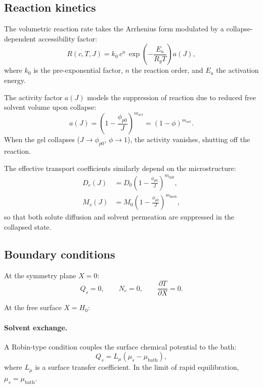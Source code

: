 \documentclass[aps,pre,reprint,superscriptaddress,longbibliography,floatfix]{revtex4-2}
\newcommand{\pp}{\phi_{p0}}
\begin{document}
\subsection{Reaction kinetics}

The volumetric reaction rate takes the Arrhenius form modulated by a collapse-dependent accessibility factor:
\begin{equation}
  R(c,T,J) = k_0\,c^n\,\exp\!\left(-\frac{E_a}{R_g T}\right) a(J),
  \label{eq:R}
\end{equation}
where $k_0$ is the pre-exponential factor, $n$ the reaction order, and $E_a$ the activation energy.

The activity factor $a(J)$ models the suppression of reaction due to reduced free solvent volume upon collapse:
\begin{equation}
  a(J) = \left(1 - \frac{\pp}{J}\right)^{m_\mathrm{act}}
  = (1-\phi)^{m_\mathrm{act}}.
  \label{eq:aJ}
\end{equation}
When the gel collapses ($J\to\pp$, $\phi\to 1$), the activity vanishes, shutting off the reaction.

The effective transport coefficients similarly depend on the microstructure:
\begin{align}
  D_c(J) &= D_0\left(1-\frac{\pp}{J}\right)^{m_\mathrm{diff}}, \label{eq:Dc} \\
  M_s(J) &= M_0\left(1-\frac{\pp}{J}\right)^{m_\mathrm{mob}}, \label{eq:Ms}
\end{align}
so that both solute diffusion and solvent permeation are suppressed in the collapsed state.

\subsection{Boundary conditions}

At the symmetry plane $X=0$:
\begin{equation}
  Q_s = 0, \qquad N_c = 0, \qquad \frac{\partial T}{\partial X} = 0.
  \label{eq:bc_sym}
\end{equation}

At the free surface $X=H_0$:

\paragraph{Solvent exchange.}
A Robin-type condition couples the surface chemical potential to the bath:
\begin{equation}
  Q_s = L_\mu\!\left(\mu_s - \mu_\mathrm{bath}\right),
  \label{eq:bc_mu}
\end{equation}
where $L_\mu$ is a surface transfer coefficient. In the limit of rapid equilibration, $\mu_s = \mu_\mathrm{bath}$.
\end{document}
